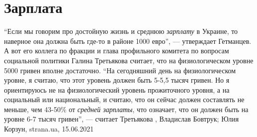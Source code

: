  
 
 
 
 
\chapter{Зарплата}

\enquote{Если мы говорим про достойную жизнь и среднюю \emph{зарплату} в Украине, то
наверное она должна быть где-то в районе 1000 евро}, — утверждает Гетманцев.  А
вот его коллега по фракции и глава профильного комитета по вопросам социальной
политики Галина Третьякова считает, что на физиологическом уровне 5000 гривен
вполне достаточно.  \enquote{На сегодняшний день на физиологическом уровне, я
считаю, что этот уровень должен быть 5-5,5 тысяч гривен. Но я ориентируюсь не
на физиологический уровень прожиточного уровня, а на социальный или
национальный, и считаю, что он сейчас должен составлять не меньше, чем 43-50\%
от \emph{средней зарплаты}, что означает, что он должен быть на уровне 6-7 тысяч
гривен}, — считает Третьякова
, 
Владислав Бовтрук; Юлия Корзун, strana.ua, 15.06.2021

